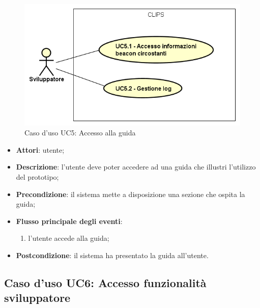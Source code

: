 \documentclass[../AnalisiDeiRequisiti.tex]{subfiles}
\begin{document}
        \begin{figure}[!h]
            \centering
            \includegraphics[scale=0.95, width=\textwidth]{img/UC5.png}
            \caption{Caso d'uso UC5: Accesso alla guida}\label{fig:UC5} 
        \end{figure}
\begin{itemize}
\item \textbf{Attori}: utente;
\item \textbf{Descrizione}: l'utente deve poter accedere ad una guida che illustri l'utilizzo del prototipo; 
      \item \textbf{Precondizione}: il sistema mette a disposizione una sezione che ospita la guida;

        \item \textbf{Flusso principale degli eventi}:
          \begin{enumerate}
          \item l'utente accede alla guida;

      \end{enumerate}
    \item \textbf{Postcondizione}: il sistema ha presentato la guida all'utente.
  \end{itemize}
\hypertarget{UC6}{}
\subsection{Caso d'uso UC6: Accesso funzionalità sviluppatore}
\end{document}
